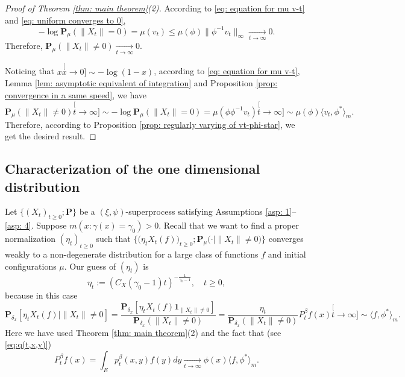 \documentclass[12pt, a4paper]{amsart}
\theoremstyle{definition}
\numberwithin{equation}{section}
\begin{document}
\begin{proof}[Proof of Theorem \ref{thm: main theorem}(2)]
	According to \eqref{eq: equation for mu v-t} and \eqref{eq: uniform converges to 0}, 
\begin{equation}
	- \log \mathbf P_\mu(\|X_t\| = 0) 
	= \mu(v_t)
	\leq \mu(\phi) \| \phi^{-1} v_t\|_{\infty}
	\xrightarrow[t\to \infty]{} 0.
\end{equation}
	Therefore, $\mathbf P_\mu(\|X_t\| \neq 0) \xrightarrow[t\to \infty]{} 0$.

	Noticing that $x \stackrel[x\to 0]{}{\sim} - \log(1-x)$, according to \eqref{eq: equation for mu v-t}, Lemma \ref{lem: asymptotic equivalent of integration} and Proposition \ref{prop: convergence in a same speed}, we have
\begin{equation}
	\mathbf P_\mu(\|X_t\| \neq 0)
	\stackrel[t\to \infty]{}{\sim} - \log \mathbf P_\mu(\|X_t\| = 0)
	= \mu(\phi \phi^{-1}v_t)
	\stackrel[t\to\infty]{}{\sim} \mu(\phi) \langle v_t, \phi^*\rangle_m.
\end{equation}
	Therefore, according to Proposition \ref{prop: regularly varying of vt-phi-star}, we get the desired result.
\end{proof}

\subsection{Characterization of the one dimensional distribution}
\label{sec: conditional distribution}
	Let $\{(X_t)_{t\geq 0}; \mathbf P\}$ be a $(\xi, \psi)$-superprocess satisfying
	Assumptions \ref{asp: 1}--\ref{asp: 4}.
	Suppose  $m(x: \gamma(x) = \gamma_0)>0$.
	Recall that we want to find a proper normalization $(\eta_t)_{t\geq 0}$ such that $\big\{\big(\eta_t X_t(f))_{t \geq 0}; \mathbf P_\mu(\cdot | \|X_t\| \neq 0\big)\big\}$ converges weakly to a non-degenerate distribution for a large class of functions $f$ and initial configurations $\mu$.
	Our guess of $(\eta_t)$ is
\begin{equation}\label{eq: definition of eta}
	\eta_t
	:= (C_X(\gamma_0 - 1) t)^{-\frac{1}{\gamma_0 - 1}},
	\quad t\geq 0,
\end{equation}
	because in this case
 \begin{equation}
 	\mathbf P_{\delta_x}[\eta_t X_t(f)|\|X_t\|\neq 0]
	= \frac{\mathbf P_{\delta_x}[\eta_t X_t(f) \mathbf 1_{\|X_t\|\neq 0}]} {\mathbf P_{\delta_x}(\|X_t\|\neq 0) }
	= \frac{\eta_t}{\mathbf P_{\delta_x}(\|X_t\|\neq 0)} P^\beta_t f(x)
	\stackrel[t\to \infty]{}{\sim}  \langle f,\phi^* \rangle_m.
 \end{equation}
 	Here we have used Theorem \ref{thm: main theorem}(2) and the fact that (see \eqref{eq:q(t,x,y)})
 \begin{equation}
 	P^\beta_t f(x)
 	= \int_E p_t^\beta(x,y)f(y)dy
 	\xrightarrow[t\to \infty]{}  \phi(x) \langle f,\phi^*\rangle_m.
 \end{equation}
 	
\end{document}
